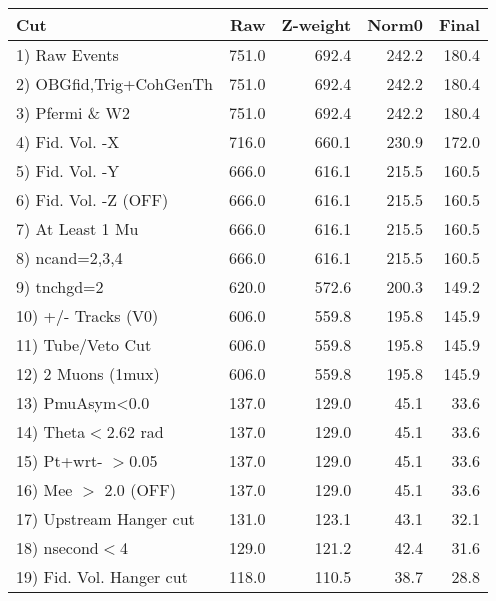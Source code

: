  \begin{table}[h!]\centering
 \begin{tabular}{||l||r|r|r|r||}
 \hline
 \hline
 Cut & Raw & Z-weight & Norm0 & Final \\
 \hline
  1) Raw Events           &       751.0 &       692.4 &       242.2 &       180.4 \\
  2) OBGfid,Trig+CohGenTh &       751.0 &       692.4 &       242.2 &       180.4 \\
  3) Pfermi \& W2         &       751.0 &       692.4 &       242.2 &       180.4 \\
  4) Fid. Vol. -X         &       716.0 &       660.1 &       230.9 &       172.0 \\
  5) Fid. Vol. -Y         &       666.0 &       616.1 &       215.5 &       160.5 \\
  6) Fid. Vol. -Z (OFF)   &       666.0 &       616.1 &       215.5 &       160.5 \\
  7) At Least 1 Mu        &       666.0 &       616.1 &       215.5 &       160.5 \\
  8) ncand=2,3,4          &       666.0 &       616.1 &       215.5 &       160.5 \\
  9) tnchgd=2             &       620.0 &       572.6 &       200.3 &       149.2 \\
 10) +/- Tracks (V0)      &       606.0 &       559.8 &       195.8 &       145.9 \\
 11) Tube/Veto Cut        &       606.0 &       559.8 &       195.8 &       145.9 \\
 12) 2 Muons (1mux)       &       606.0 &       559.8 &       195.8 &       145.9 \\
 13) PmuAsym<0.0          &       137.0 &       129.0 &        45.1 &        33.6 \\
 14) Theta$<$2.62 rad     &       137.0 &       129.0 &        45.1 &        33.6 \\
 15) Pt+wrt- $>$0.05      &       137.0 &       129.0 &        45.1 &        33.6 \\
 16) Mee $>$ 2.0  (OFF)   &       137.0 &       129.0 &        45.1 &        33.6 \\
 17) Upstream Hanger cut  &       131.0 &       123.1 &        43.1 &        32.1 \\
 18) nsecond$<$4          &       129.0 &       121.2 &        42.4 &        31.6 \\
 19) Fid. Vol. Hanger cut &       118.0 &       110.5 &        38.7 &        28.8 \\

\end{tabular}
\end{table}
